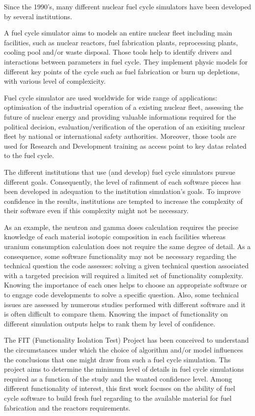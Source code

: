 Since the 1990's, many different nuclear fuel cycle simulators have been
developed by several institutions.

A fuel cycle simulator aims to models an entire nuclear fleet including main
facilities, such as nuclear reactors, fuel fabrication plants, reprocessing
plants, cooling pool and/or waste disposal. Those tools help to identify drivers
and interactions between parameters in fuel cycle. They implement physic models
for different key points of the cycle such as fuel fabrication or burn up
depletions, with various level of complexicity. 

Fuel cycle simulator are used worldwide for wide range of applications:
optimisation of the industrial operation of a existing nuclear fleet, assessing
the future of nuclear energy and providing valuable informations required for
the political decision, evaluation/verification of the operation of an exisiting
nuclear fleet by national or international safety authorities. Moreover, those
tools are used for Research and Development training as access point to key
datas related to the fuel cycle. 

The different institutions that use (and develop) fuel cycle simulators pursue
different goals. Consequently, the level of rafinment of each software pieces
has been developed in adequation to the institution simulation's goals. To improve
confidence in the results, institutions are tempted to increase the complexity
of their software even if this complexity might not be necessary.

As an example, the neutron and gamma doses calculation requires the precise
knowledge of each material isotopic composition in each facilities whereas
uranium consumption calculation does not require the same degree of detail. As a
consequence, some software functionality may not be necessary regarding the
technical question the code assesses: solving a given technical question
associated with a targeted precision will required a limited set of
functionality complexity. Knowing the importance of each ones helps to choose an
appropriate software or to engage code developments to solve a specific
question. Also, some technical issues are assessed by numerous studies performed
with different software and it is often difficult to compare them. Knowing the
impact of functionality on different simulation outputs helps to rank them by
level of confidence.

The FIT (Functionality Isolation Test) Project has been conceived to understand
the circumstances under which the choice of algorithm and/or model influences
the conclusions that one might draw from such a fuel cycle simulation. Ths
project aims to determine the minimum level of details in fuel cycle simulations
required as a function of the study and the wanted confidence level. Among
different functionality of interest, this first work focuses on the ability of
fuel cycle software to build fresh fuel regarding to the available material for
fuel fabrication and the reactors requirements.

